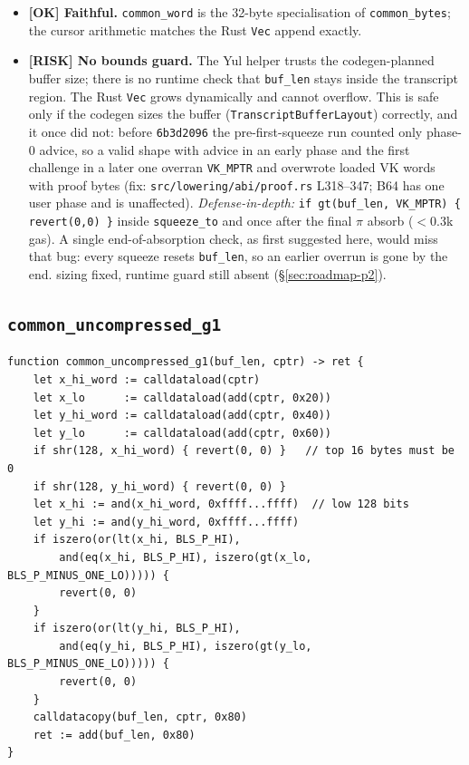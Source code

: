 \begin{itemize}
  \item \textcolor{tracegreen}{\textbf{[OK] Faithful.}} \texttt{common\_word}
        is the 32-byte specialisation of \texttt{common\_bytes}; the
        cursor arithmetic matches the Rust \texttt{Vec} append exactly.
  \item \textcolor{rustorange}{\textbf{[RISK] No bounds guard.}} The Yul
        helper trusts the codegen-planned buffer size; there is no
        runtime check that \texttt{buf\_len} stays inside the transcript
        region. The Rust \texttt{Vec} grows dynamically and cannot
        overflow. This is safe only if the codegen sizes the buffer
        (\texttt{TranscriptBufferLayout}) correctly, and it once did
        not: before \texttt{6b3d2096} the pre-first-squeeze run counted
        only phase-0 advice, so a valid shape with advice in an early
        phase and the first challenge in a later one overran
        \texttt{VK\_MPTR} and overwrote loaded VK words with proof bytes
        (fix: \texttt{src/\allowbreak{}lowering/\allowbreak{}abi/\allowbreak{}proof.rs} L318--347; B64 has one
        user phase and is unaffected). \emph{Defense-in-depth:}
        \texttt{if gt(buf\_\allowbreak{}len, VK\_\allowbreak{}MPTR) \{ revert(0,0) \}} inside
        \texttt{squeeze\_to} and once after the final $\pi$ absorb
        ($<$0.3k gas). A single end-of-absorption check, as first
        suggested here, would miss that bug: every squeeze resets
        \texttt{buf\_len}, so an earlier overrun is gone by the end.
         sizing fixed, runtime guard still absent
        (\S\ref{sec:roadmap-p2}).
\end{itemize}

\subsection{\texttt{common\_\allowbreak{}uncompressed\_\allowbreak{}g1}}
\label{sec:common-g1}

\begin{lstlisting}[style=yul]
function common_uncompressed_g1(buf_len, cptr) -> ret {
    let x_hi_word := calldataload(cptr)
    let x_lo      := calldataload(add(cptr, 0x20))
    let y_hi_word := calldataload(add(cptr, 0x40))
    let y_lo      := calldataload(add(cptr, 0x60))
    if shr(128, x_hi_word) { revert(0, 0) }   // top 16 bytes must be 0
    if shr(128, y_hi_word) { revert(0, 0) }
    let x_hi := and(x_hi_word, 0xffff...ffff)  // low 128 bits
    let y_hi := and(y_hi_word, 0xffff...ffff)
    if iszero(or(lt(x_hi, BLS_P_HI),
        and(eq(x_hi, BLS_P_HI), iszero(gt(x_lo, BLS_P_MINUS_ONE_LO))))) {
        revert(0, 0)
    }
    if iszero(or(lt(y_hi, BLS_P_HI),
        and(eq(y_hi, BLS_P_HI), iszero(gt(y_lo, BLS_P_MINUS_ONE_LO))))) {
        revert(0, 0)
    }
    calldatacopy(buf_len, cptr, 0x80)
    ret := add(buf_len, 0x80)
}
\end{lstlisting}

